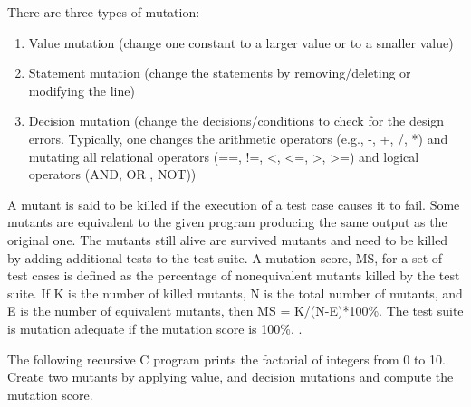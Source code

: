 There are three types of mutation:
\begin{enumerate}[nosep]
  \item Value mutation (change one constant to a larger value or to a smaller value)
 \item Statement mutation (change the statements by removing/deleting or modifying the line)
 \item Decision mutation (change the decisions/conditions to check for the design errors. Typically, one changes the arithmetic operators (e.g., -, +, /, *) and mutating all relational operators (==, !=, <, <=, >, >=) and logical operators (AND, OR , NOT))
\end{enumerate}
A mutant is said to be killed if the execution of a test case causes it to fail. Some mutants are equivalent to the given program producing the same output as the original one. The mutants still alive are survived mutants and need to be killed by adding additional tests to the test suite. A mutation score, MS, for a set of test cases is defined as the percentage of nonequivalent mutants killed by the test suite. If K is the number of killed mutants, N is the total number of mutants, and E is the number of equivalent mutants, then MS = K/(N-E)*100\%. The test suite is mutation adequate if the mutation score is 100\%. . 
\begin{Exercise}
The following recursive C program prints the factorial of integers from 0 to 10. Create two mutants by applying value, and decision mutations and compute the mutation score.
\end{Exercise}

